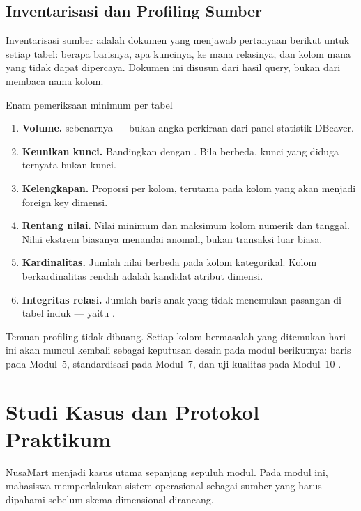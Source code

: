 \subsection{Inventarisasi dan Profiling Sumber}

Inventarisasi sumber adalah dokumen yang menjawab pertanyaan berikut untuk
setiap tabel: berapa barisnya, apa kuncinya, ke mana relasinya, dan kolom mana
yang tidak dapat dipercaya. Dokumen ini disusun dari hasil query, bukan dari
membaca nama kolom.

\begin{konsep}{Enam pemeriksaan minimum per tabel}
\begin{enumerate}[leftmargin=1.4em]
  \item \textbf{Volume.}  sebenarnya --- bukan angka
        perkiraan dari panel statistik DBeaver.
  \item \textbf{Keunikan kunci.} Bandingkan  dengan
        . Bila berbeda, kunci yang diduga
        ternyata bukan kunci.
  \item \textbf{Kelengkapan.} Proporsi  per kolom, terutama pada
        kolom yang akan menjadi foreign key dimensi.
  \item \textbf{Rentang nilai.} Nilai minimum dan maksimum kolom numerik dan
        tanggal. Nilai ekstrem biasanya menandai anomali, bukan transaksi luar
        biasa.
  \item \textbf{Kardinalitas.} Jumlah nilai berbeda pada kolom kategorikal.
        Kolom berkardinalitas rendah adalah kandidat atribut dimensi.
  \item \textbf{Integritas relasi.} Jumlah baris anak yang tidak menemukan
        pasangan di tabel induk --- yaitu .
\end{enumerate}
\end{konsep}

Temuan profiling tidak dibuang. Setiap kolom bermasalah yang ditemukan hari ini
akan muncul kembali sebagai keputusan desain pada modul berikutnya: baris
 pada Modul~5, standardisasi pada Modul~7, dan uji kualitas
pada Modul~10 \citep{batini2016}.

\section{Studi Kasus dan Protokol Praktikum}

NusaMart menjadi kasus utama sepanjang sepuluh modul. Pada modul ini,
mahasiswa memperlakukan sistem operasional sebagai sumber yang harus dipahami
sebelum skema dimensional dirancang.

